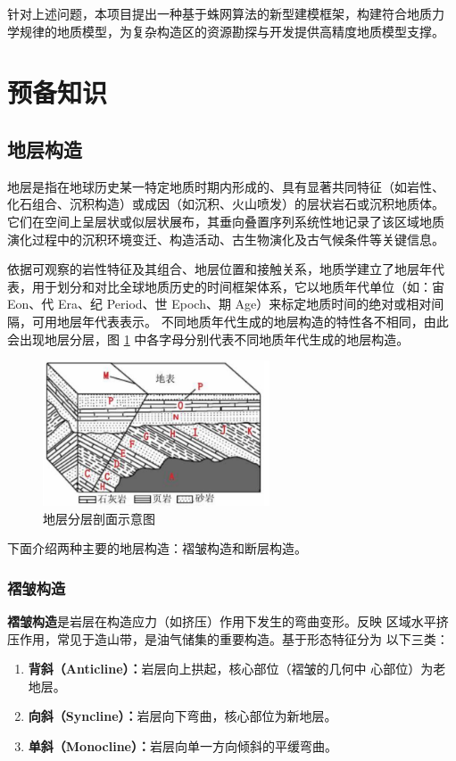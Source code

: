 \documentclass[a4paper,twoside]{ctexart}
\begin{document}
针对上述问题，本项目提出一种基于蛛网算法的新型建模框架，构建符合地质力
学规律的地质模型，为复杂构造区的资源勘探与开发提供高精度地质模型支撑。

\section{预备知识}
\label{sec:Preliminary}

\subsection{地层构造}

地层是指在地球历史某一特定地质时期内形成的、具有显著共同特征（如岩性、
化石组合、沉积构造）或成因（如沉积、火山喷发）的层状岩石或沉积地质体。
它们在空间上呈层状或似层状展布，其垂向叠置序列系统性地记录了该区域地质
演化过程中的沉积环境变迁、构造活动、古生物演化及古气候条件等关键信息。

依据可观察的岩性特征及其组合、地层位置和接触关系，地质学建立了地层年代
表，用于划分和对比全球地质历史的时间框架体系，它以地质年代单位（如：宙
Eon、代 Era、纪 Period、世 Epoch、期 Age）来标定地质时间的绝对或相对间
隔，可用地层年代表表示。
不同地质年代生成的地层构造的特性各不相同，由此会出现地层分层，图
\ref{fig:地层分层剖面} 中各字母分别代表不同地质年代生成的地层构造。 
  \begin{figure}[htbp]
  \centering
    \includegraphics[width=0.6\textwidth]{pic/地层年代剖面.png}
  \caption{地层分层剖面示意图}
  \label{fig:地层分层剖面}
\end{figure}

下面介绍两种主要的地层构造：褶皱构造和断层构造。 

\subsubsection{褶皱构造}
\textbf{褶皱构造}是岩层在构造应力（如挤压）作用下发生的弯曲变形。反映
区域水平挤压作用，常见于造山带，是油气储集的重要构造。基于形态特征分为
以下三类： 
\begin{enumerate}
\item \textbf{背斜（Anticline）：}岩层向上拱起，核心部位（褶皱的几何中
  心部位）为老地层。
\item \textbf{向斜（Syncline）：}岩层向下弯曲，核心部位为新地层。
\item \textbf{单斜（Monocline）：}岩层向单一方向倾斜的平缓弯曲。
\end{enumerate}
\end{document}
